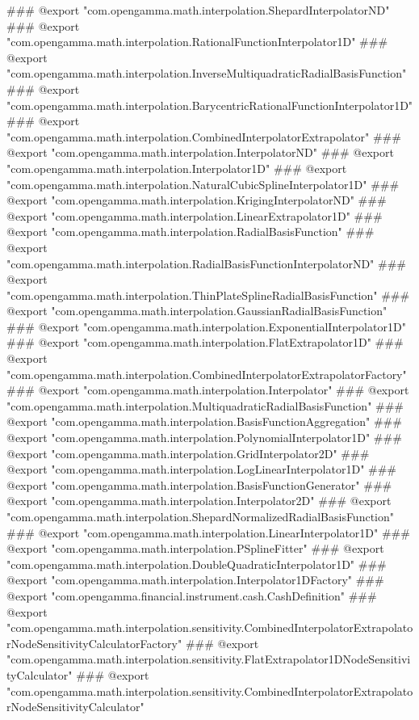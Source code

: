 ### @export "com.opengamma.math.interpolation.ShepardInterpolatorND"
### @export "com.opengamma.math.interpolation.RationalFunctionInterpolator1D"
### @export "com.opengamma.math.interpolation.InverseMultiquadraticRadialBasisFunction"
### @export "com.opengamma.math.interpolation.BarycentricRationalFunctionInterpolator1D"
### @export "com.opengamma.math.interpolation.CombinedInterpolatorExtrapolator"
### @export "com.opengamma.math.interpolation.InterpolatorND"
### @export "com.opengamma.math.interpolation.Interpolator1D"
### @export "com.opengamma.math.interpolation.NaturalCubicSplineInterpolator1D"
### @export "com.opengamma.math.interpolation.KrigingInterpolatorND"
### @export "com.opengamma.math.interpolation.LinearExtrapolator1D"
### @export "com.opengamma.math.interpolation.RadialBasisFunction"
### @export "com.opengamma.math.interpolation.RadialBasisFunctionInterpolatorND"
### @export "com.opengamma.math.interpolation.ThinPlateSplineRadialBasisFunction"
### @export "com.opengamma.math.interpolation.GaussianRadialBasisFunction"
### @export "com.opengamma.math.interpolation.ExponentialInterpolator1D"
### @export "com.opengamma.math.interpolation.FlatExtrapolator1D"
### @export "com.opengamma.math.interpolation.CombinedInterpolatorExtrapolatorFactory"
### @export "com.opengamma.math.interpolation.Interpolator"
### @export "com.opengamma.math.interpolation.MultiquadraticRadialBasisFunction"
### @export "com.opengamma.math.interpolation.BasisFunctionAggregation"
### @export "com.opengamma.math.interpolation.PolynomialInterpolator1D"
### @export "com.opengamma.math.interpolation.GridInterpolator2D"
### @export "com.opengamma.math.interpolation.LogLinearInterpolator1D"
### @export "com.opengamma.math.interpolation.BasisFunctionGenerator"
### @export "com.opengamma.math.interpolation.Interpolator2D"
### @export "com.opengamma.math.interpolation.ShepardNormalizedRadialBasisFunction"
### @export "com.opengamma.math.interpolation.LinearInterpolator1D"
### @export "com.opengamma.math.interpolation.PSplineFitter"
### @export "com.opengamma.math.interpolation.DoubleQuadraticInterpolator1D"
### @export "com.opengamma.math.interpolation.Interpolator1DFactory"
### @export "com.opengamma.financial.instrument.cash.CashDefinition"
### @export "com.opengamma.math.interpolation.sensitivity.CombinedInterpolatorExtrapolatorNodeSensitivityCalculatorFactory"
### @export "com.opengamma.math.interpolation.sensitivity.FlatExtrapolator1DNodeSensitivityCalculator"
### @export "com.opengamma.math.interpolation.sensitivity.CombinedInterpolatorExtrapolatorNodeSensitivityCalculator"
